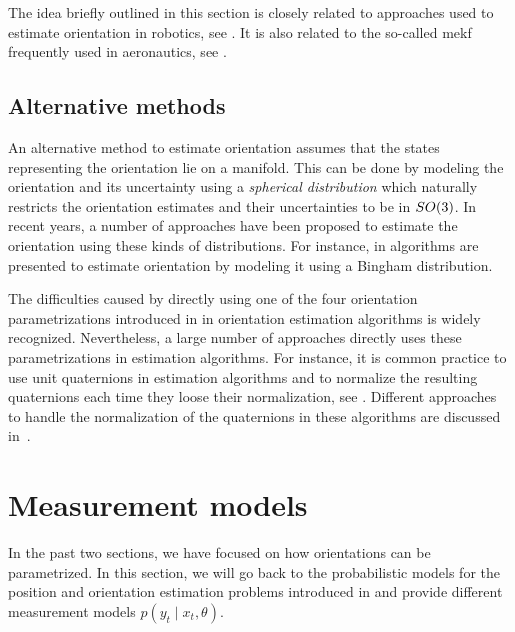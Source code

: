 The idea briefly outlined in this section is closely related to approaches used to estimate orientation in robotics, see \eg \cite{grisettiKSB:2010,grisettiKSFH:2010,bloeschEtAl:2016,barfoot:2016,forsterCDS:2016}. It is also related to the so-called \gls{mekf} frequently used in aeronautics, see \eg \cite{markley:2003,crassidisMC:2007}. 

\subsection{Alternative methods}
\label{sec:models-altProbOriModels}
An alternative method to estimate orientation assumes that the states representing the orientation lie on a manifold. This can be done by modeling the orientation and its uncertainty using a \emph{spherical distribution} which naturally restricts the orientation estimates and their uncertainties to be in $SO(3)$. In recent years, a number of approaches have been proposed to estimate the orientation using these kinds of distributions. For instance, in \cite{kurzGJH:2013,gilitschenskiKJH:2016,gloverK:2013} algorithms are presented to estimate orientation by modeling it using a Bingham distribution. 

The difficulties caused by directly using one of the four orientation parametrizations introduced in  in orientation estimation algorithms is widely recognized. Nevertheless, a large number of approaches directly uses these parametrizations in estimation algorithms. For instance, it is common practice to use unit quaternions in estimation algorithms and to normalize the resulting quaternions each time they loose their normalization, see \eg \cite{sabatini:2006,marinsYBMZ:2001,madgwickHV:2011}. Different approaches to handle the normalization of the quaternions in these algorithms are discussed in~\cite{julierV:2007}.

\section{Measurement models}
\label{sec:models-measModels}
In the past two sections, we have focused on how orientations can be parametrized. In this section, we will go back to the probabilistic models for the position and orientation estimation problems introduced in  and provide different measurement models $p(y_t \mid x_t, \theta)$. 

